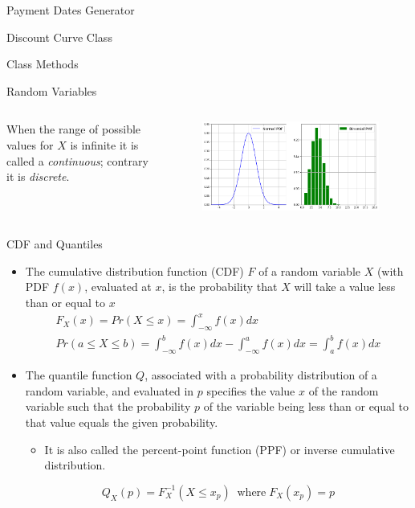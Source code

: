 \documentclass{beamer}
\begin{document}
\begin{frame}[fragile]{Payment Dates Generator}
\begin{itemize}
\begin{frame}{Discount Curve Class}
\begin{frame}{Class Methods}
\begin{itemize}
\begin{iptyhon}
    
\begin{frame}{Random Variables}
    \begin{columns}
    When the range of possible values for $X$ is infinite it is called a \emph{continuous}; contrary it is \emph{discrete}.
    \begin{figure}[h]
    \begin{center}
    \includegraphics[width=1.0\linewidth]{rv_pdf}
    \end{center}
    \end{figure}    
    \end{columns}
\end{frame}

\begin{frame}{CDF and Quantiles}
	\begin{itemize}
    \item The cumulative distribution function (CDF) $F$ of a random variable $X$ (with PDF $f(x)$, evaluated at $x$, is the probability that $X$ will take a value less than or equal to $x$
    \begin{equation*}
        \begin{gathered}
            F_X(x) = Pr(X\leq x) = \int_{-\infty}^{x} f(x)dx\\
            Pr(a \leq X\leq b) = \int_{-\infty}^{b} f(x)dx - \int_{-\infty}^{a} f(x)dx = \int_{a}^{b} f(x)dx
        \end{gathered}
    \end{equation*}
    
    \item The quantile function $Q$, associated with a probability distribution of a random variable, and evaluated in $p$ specifies the value $x$ of the random variable such that the probability $p$ of the variable being less than or equal to that value equals the given probability. 
    \begin{itemize}
        \item It is also called the percent-point function (PPF) or inverse cumulative distribution.
    \end{itemize}
    \begin{equation*}    
        Q_X(p) = F_X^{-1}(X \leq x_p)\;\;\textrm{where}\; F_X(x_p) = p
    \end{equation*}
    

\end{itemize}
\end{frame}
\end{iptyhon}
\end{itemize}
\end{frame}
\end{frame}
\end{itemize}
\end{frame}
\end{document}
